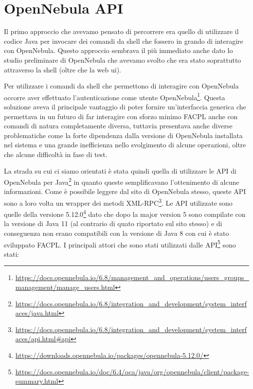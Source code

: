 \section{OpenNebula API}
Il primo approccio che avevamo pensato di percorrere era quello di utilizzare il codice Java per invocare dei comandi da shell che fossero in grando di interagire con OpenNebula. Questo approccio sembrava il più immediato anche dato lo studio preliminare di OpenNebula che avevamo svolto che era stato soprattutto attraverso la shell (oltre che la web ui).\par
Per utilizzare i comandi da shell che permettono di interagire con OpenNebula occorre aver effettuato l'autenticazione come utente OpenNebula\footnote{\url{https://docs.opennebula.io/6.8/management_and_operations/users_groups_management/manage_users.html}}.
Questa soluzione aveva il principale vantaggio di poter fornire un'interfaccia generica che permettava in un futuro di far interagire con sforzo minimo FACPL anche con comandi di natura completamente diversa, tuttavia presentava anche diverse problematiche come la forte dipendenza dalla versione di OpenNebula installata nel sistema e una grande inefficienza nello svolgimento di alcune operazioni, oltre che alcune difficoltà in fase di test.\par
La strada su cui ci siamo orientati è stata quindi quella di utilizzare le API di OpenNebula per Java\footnote{\url{https://docs.opennebula.io/6.8/integration_and_development/system_interfaces/java.html}} in quanto queste semplificavano l'ottenimento di alcune informazioni. Come è possibile leggere dal sito di OpenNebula stesso, queste API sono a loro volta un wrapper dei metodi XML-RPC\footnote{\url{https://docs.opennebula.io/6.8/integration_and_development/system_interfaces/api.html\#api}}.
Le API utilizzate sono quelle della versione 5.12.0\footnote{\url{https://downloads.opennebula.io/packages/opennebula-5.12.0/}} dato che dopo la major version 5 sono compilate con la versione di Java 11 (al contrario di quato riportato sul sito stesso) e di conseguenza non erano compatibili con la versione di Java 8 con cui è stato sviluppato FACPL.
I principali attori che sono stati utilizzati dalle API\footnote{\url{https://docs.opennebula.io/doc/6.4/oca/java/org/opennebula/client/package-summary.html}} sono stati:
